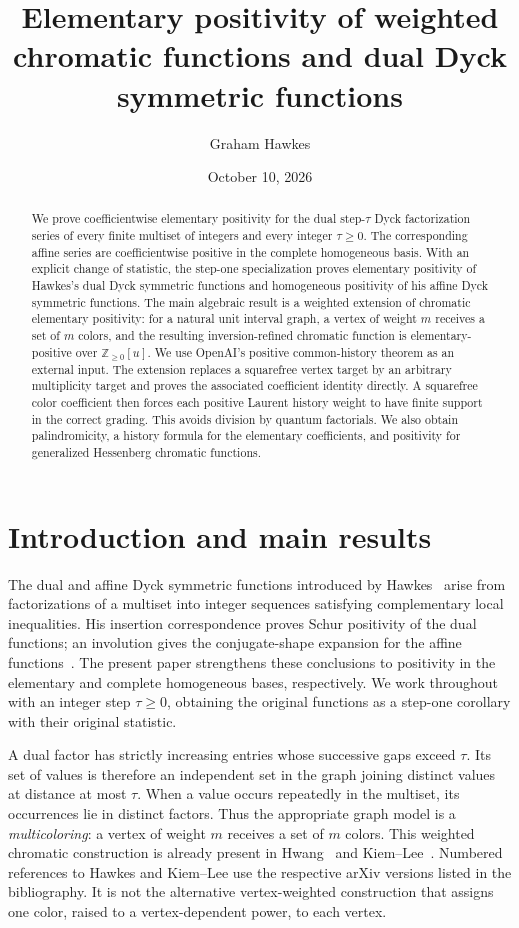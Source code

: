 \documentclass[11pt,reqno]{amsart}
\title[Weighted chromatic and dual Dyck positivity]{Elementary positivity of weighted chromatic functions and dual Dyck symmetric functions}
\author{Graham Hawkes}
\date{October 10, 2026}
\theoremstyle{definition}
\theoremstyle{remark}
\numberwithin{equation}{section}
\begin{document}
\begin{abstract}
We prove coefficientwise elementary positivity for the dual step-$\tau$
Dyck factorization series of every finite multiset of integers and every
integer $\tau\geq0$.  The corresponding affine series are coefficientwise
positive in the complete homogeneous basis.  With an explicit change of
statistic, the step-one specialization proves elementary positivity of
Hawkes's dual Dyck symmetric functions and homogeneous positivity of his
affine Dyck symmetric functions.  The main algebraic result is a weighted
extension of chromatic elementary positivity: for a natural unit interval
graph, a vertex of weight $m$ receives a set of $m$ colors, and the resulting
inversion-refined chromatic function is elementary-positive over
$\mathbb Z_{\geq0}[u]$.  We use OpenAI's positive common-history theorem as
an external input.  The extension replaces a squarefree vertex target by
an arbitrary multiplicity target and proves the associated coefficient
identity directly.  A squarefree color coefficient then forces each
positive Laurent history weight to have finite support in the correct
grading.  This avoids division by quantum factorials.  We also obtain
palindromicity, a history formula for the elementary coefficients, and
positivity for generalized Hessenberg chromatic functions.
\end{abstract}
\maketitle

\section{Introduction and main results}\label{sec:intro}

The dual and affine Dyck symmetric functions introduced by
Hawkes~\cite{Hawkes2026} arise from factorizations of a multiset into
integer sequences satisfying complementary local inequalities.  His
insertion correspondence proves Schur positivity of the dual functions;
an involution gives the conjugate-shape expansion for the affine
functions~\cite[Theorem~3.18 and Corollaries~3.19--3.20]{Hawkes2026}.
The present paper strengthens these conclusions to positivity in the
elementary and complete homogeneous bases, respectively.  We work
throughout with an integer step $\tau\geq0$, obtaining the original
functions as a step-one corollary with their original statistic.

A dual factor has strictly increasing entries whose successive gaps
exceed $\tau$.  Its set of values is therefore an independent set in the
graph joining distinct values at distance at most $\tau$.  When a value
occurs repeatedly in the multiset, its occurrences lie in distinct
factors.  Thus the appropriate graph model is a \emph{multicoloring}:
a vertex of weight $m$ receives a set of $m$ colors.  This weighted
chromatic construction is already present in Hwang~\cite{Hwang2024}
and Kiem--Lee~\cite[Definitions~4.1--4.3]{KiemLee2024}.
Numbered references to Hawkes and Kiem--Lee use the respective arXiv
versions listed in the bibliography.  It is not the
alternative vertex-weighted construction that assigns one color, raised
to a vertex-dependent power, to each vertex.
\end{document}
